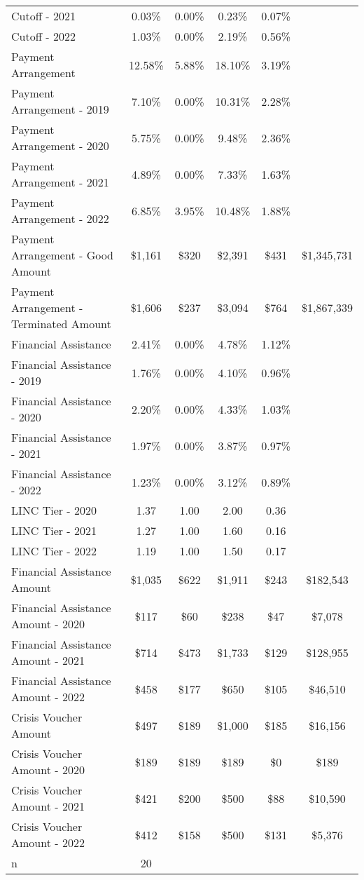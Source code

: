 \begin{tabular}{l|c|c|c|c|c}
\quad Cutoff - 2021 & 0.03\% & 0.00\% & 0.23\% & 0.07\% \\
\quad Cutoff - 2022 & 1.03\% & 0.00\% & 2.19\% & 0.56\% \\
\midrule 
Payment Arrangement & 12.58\% & 5.88\% & 18.10\% & 3.19\% \\
\quad Payment Arrangement - 2019 & 7.10\% & 0.00\% & 10.31\% & 2.28\% \\
\quad Payment Arrangement - 2020 & 5.75\% & 0.00\% & 9.48\% & 2.36\% \\
\quad Payment Arrangement - 2021 & 4.89\% & 0.00\% & 7.33\% & 1.63\% \\
\quad Payment Arrangement - 2022 & 6.85\% & 3.95\% & 10.48\% & 1.88\% \\
\quad Payment Arrangement - Good Amount & \$1,161 & \$320 & \$2,391 & \$431 & \$1,345,731 \\
\quad Payment Arrangement - Terminated Amount & \$1,606 & \$237 & \$3,094 & \$764 & \$1,867,339 \\
\midrule 
Financial Assistance & 2.41\% & 0.00\% & 4.78\% & 1.12\% \\
\quad Financial Assistance - 2019 & 1.76\% & 0.00\% & 4.10\% & 0.96\% \\
\quad Financial Assistance - 2020 & 2.20\% & 0.00\% & 4.33\% & 1.03\% \\
\quad Financial Assistance - 2021 & 1.97\% & 0.00\% & 3.87\% & 0.97\% \\
\quad Financial Assistance - 2022 & 1.23\% & 0.00\% & 3.12\% & 0.89\% \\
\midrule 
LINC Tier - 2020 & 1.37 & 1.00 & 2.00 & 0.36 \\
LINC Tier - 2021 & 1.27 & 1.00 & 1.60 & 0.16 \\
LINC Tier - 2022 & 1.19 & 1.00 & 1.50 & 0.17 \\
\midrule 
Financial Assistance Amount & \$1,035 & \$622 & \$1,911 & \$243 & \$182,543 \\
\quad Financial Assistance Amount - 2020 & \$117 & \$60 & \$238 & \$47 & \$7,078 \\
\quad Financial Assistance Amount - 2021 & \$714 & \$473 & \$1,733 & \$129 & \$128,955 \\
\quad Financial Assistance Amount - 2022 & \$458 & \$177 & \$650 & \$105 & \$46,510 \\
\midrule 
Crisis Voucher Amount & \$497 & \$189 & \$1,000 & \$185 & \$16,156 \\
\quad Crisis Voucher Amount - 2020 & \$189 & \$189 & \$189 & \$0 & \$189 \\
\quad Crisis Voucher Amount - 2021 & \$421 & \$200 & \$500 & \$88 & \$10,590 \\
\quad Crisis Voucher Amount - 2022 & \$412 & \$158 & \$500 & \$131 & \$5,376 \\
\midrule 
n & 20 &  &  &  &  \\
\midrule 
\bottomrule 
\end{tabular}
